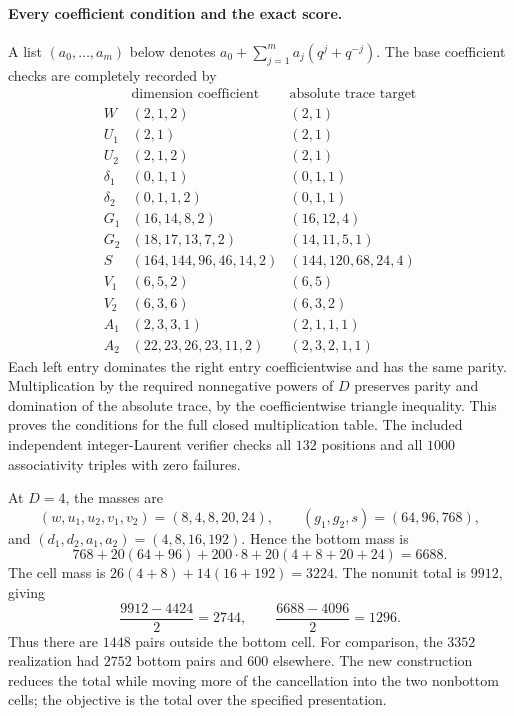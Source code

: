 \paragraph{Every coefficient condition and the exact score.}
A list $(a_0,\ldots,a_m)$ below denotes
$a_0+\sum_{j=1}^m a_j(q^j+q^{-j})$.
The base coefficient checks are completely recorded by
\[
\begin{array}{c|l|l}
 &\text{dimension coefficient}&\text{absolute trace target}\\\hline
 W&(2,1,2)&(2,1)\\
 U_1&(2,1)&(2,1)\\
 U_2&(2,1,2)&(2,1)\\
 \delta_1&(0,1,1)&(0,1,1)\\
 \delta_2&(0,1,1,2)&(0,1,1)\\
 G_1&(16,14,8,2)&(16,12,4)\\
 G_2&(18,17,13,7,2)&(14,11,5,1)\\
 S&(164,144,96,46,14,2)&(144,120,68,24,4)\\
 V_1&(6,5,2)&(6,5)\\
 V_2&(6,3,6)&(6,3,2)\\
 A_1&(2,3,3,1)&(2,1,1,1)\\
 A_2&(22,23,26,23,11,2)&(2,3,2,1,1)
\end{array}                                                         \tag{G033.2}
\]
Each left entry dominates the right entry coefficientwise
and has the same parity. Multiplication by the required
nonnegative powers of $D$ preserves parity and domination
of the absolute trace, by the coefficientwise triangle
inequality. This proves the conditions for the full
closed multiplication table. The included independent
integer-Laurent verifier checks all $132$ positions and
all $1000$ associativity triples with zero failures.

At $D=4$, the masses are
\[
 (w,u_1,u_2,v_1,v_2)=(8,4,8,20,24),\qquad
 (g_1,g_2,s)=(64,96,768),
\]
and $(d_1,d_2,a_1,a_2)=(4,8,16,192)$.
Hence the bottom mass is
\[
 768+20(64+96)+200\cdot8+20(4+8+20+24)=6688.
\]
The cell mass is $26(4+8)+14(16+192)=3224$.
The nonunit total is $9912$, giving
\[
 \frac{9912-4424}{2}=2744,\qquad
 \frac{6688-4096}{2}=1296.                         \tag{G033.3}
\]
Thus there are $1448$ pairs outside the bottom cell.
For comparison, the $3352$ realization had $2752$
bottom pairs and $600$ elsewhere. The new construction
reduces the total while moving more of the cancellation
into the two nonbottom cells; the objective is the total
over the specified presentation.

